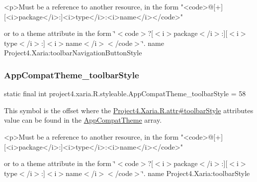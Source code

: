 \begin{DoxyVerb}      <p>Must be a reference to another resource, in the form "<code>@[+][<i>package</i>:]<i>type</i>:<i>name</i></code>"
\end{DoxyVerb}
 or to a theme attribute in the form \char`\"{}$<$code$>$?\mbox{[}$<$i$>$package$<$/i$>$\+:\mbox{]}\mbox{[}$<$i$>$type$<$/i$>$\+:\mbox{]}$<$i$>$name$<$/i$>$$<$/code$>$\char`\"{}.  name Project4.\+Xaria\+:toolbar\+Navigation\+Button\+Style \mbox{\label{classproject4_1_1xaria_1_1R_1_1styleable_a77e2df5acbe372a663d1ccbcf26269ee}} 
\subsubsection{\texorpdfstring{App\+Compat\+Theme\+\_\+toolbar\+Style}{AppCompatTheme\_toolbarStyle}}
{\footnotesize\ttfamily static final int project4.\+xaria.\+R.\+styleable.\+App\+Compat\+Theme\+\_\+toolbar\+Style = 58\hspace{0.3cm}{\ttfamily [static]}}

This symbol is the offset where the \hyperlink{}{Project4.\+Xaria.\+R.\+attr\#toolbar\+Style} attribute\textquotesingle{}s value can be found in the \hyperlink{classproject4_1_1xaria_1_1R_1_1styleable_aad8bec413e2350f9404e6ff0e831a85d}{App\+Compat\+Theme} array.

\begin{DoxyVerb}      <p>Must be a reference to another resource, in the form "<code>@[+][<i>package</i>:]<i>type</i>:<i>name</i></code>"
\end{DoxyVerb}
 or to a theme attribute in the form \char`\"{}$<$code$>$?\mbox{[}$<$i$>$package$<$/i$>$\+:\mbox{]}\mbox{[}$<$i$>$type$<$/i$>$\+:\mbox{]}$<$i$>$name$<$/i$>$$<$/code$>$\char`\"{}.  name Project4.\+Xaria\+:toolbar\+Style \mbox{\label{classproject4_1_1xaria_1_1R_1_1styleable_a63da97bf5664857a9e2d0b8f5ba65d80}} 
